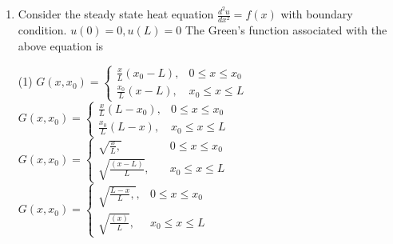 \begin{enumerate}[label=\color{ocre}\textbf{\arabic*.}]
$$u(0)=0, u(L)=0
$$
The Green's function associated with the above equation
 \begin{tasks}(2)
	\task[\textbf{a.}]Constant
	\task[\textbf{b.}] Linear function
	\task[\textbf{c.}] Parabolic function
	\task[\textbf{d.}] Hyperbolic function
\end{tasks}
\begin{answer}
	\begin{align*}
	\intertext{The Green's function satisfies}
	\frac{d^{2} G\left(x, x_{0}\right)}{d x^{2}}&=\delta\left(x-x_{0}\right)\\
\text{	with }G\left(0, x_{0}\right)&=0\text{ and }G\left(L, x_{0}\right)=0
\intertext{Corresponding homogeneous equation is:}
\frac{d^{2} G}{d x^{2}}&=0\\
\text{Solution for }x \neq x_{0}&\text{ are, }G\left(x, x_{0}\right)= \begin{cases}a+b x_{2} & x<x_{1+} \\ c+d x, & x>x_{0}\end{cases}
	\end{align*}
		So the correct answer is \textbf{Option (b)}
\end{answer}
\item Consider the steady state heat equation $\frac{d^{2} u}{d x^{2}}=f(x)$ with boundary condition. $u(0)=0, u(L)=0$
The Green's function associated with the above equation is
 \begin{tasks}(1)
	\task[\textbf{a.}] $G\left(x, x_{0}\right)= \begin{cases}\frac{x}{L}\left(x_{0}-L\right), & 0 \leq x \leq x_{0} \\ \frac{x_{0}}{L}(x-L), & x_{0} \leq x \leq L\end{cases}$
	\task[\textbf{b.}] $G\left(x, x_{0}\right)= \begin{cases}\frac{x}{L}\left(L-x_{0}\right), & 0 \leq x \leq x_{0} \\ \frac{x_{0}}{L}(L-x), & x_{0} \leq x \leq L\end{cases}$
	\task[\textbf{c.}] $G\left(x, x_{0}\right)= \begin{cases}\sqrt{\frac{x}{L},} &\quad 0 \leq x \leq x_{0} \\ \sqrt{\frac{(x-L)}{L}}, & \quad x_{0} \leq x \leq L\end{cases}$
	\task[\textbf{d.}] $G\left(x, x_{0}\right)= \begin{cases}\sqrt{\frac{L-x}{L},}, & 0 \leq x \leq x_{0} \\ \sqrt{\frac{(x)}{L}}, & x_{0} \leq x \leq L\end{cases}$

\end{tasks}
\end{enumerate}
